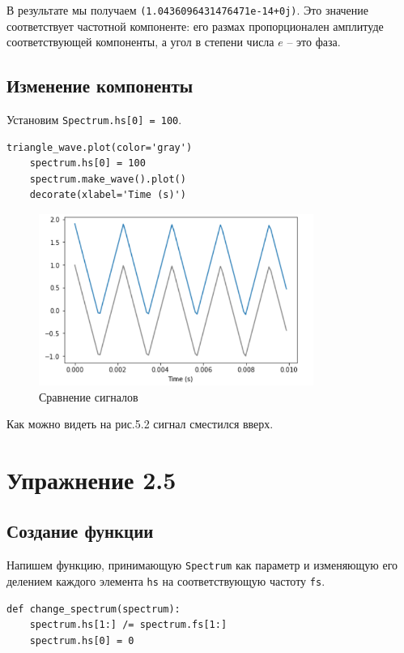 \documentclass[a4paper,12pt]{report}
\begin{document}
    В результате мы получаем \texttt{(1.0436096431476471e-14+0j)}. Это значение соответствует частотной компоненте: его размах пропорционален амплитуде соответствующей компоненты, а угол в степени числа $e$ – это фаза.

\section{Изменение компоненты}
    Установим \texttt{Spectrum.hs[0] = 100}.
\begin{lstlisting}[caption=Изменение компоненты]
    triangle_wave.plot(color='gray')
    spectrum.hs[0] = 100
    spectrum.make_wave().plot()
    decorate(xlabel='Time (s)')
\end{lstlisting}

\begin{figure}[H]
        \centering
        \includegraphics[width=0.8\textwidth]{fig5-2.PNG}
        \caption{Сравнение сигналов}
        \label{fig:fig5-2}
\end{figure}   

    Как можно видеть на рис.5.2 сигнал сместился вверх.

\chapter{Упражнение 2.5}
\section{Создание функции}
    Напишем функцию, принимающую  \texttt{Spectrum} как параметр и изменяющую его делением каждого элемента \texttt{hs} на соответствующую частоту \texttt{fs}.
\begin{lstlisting}[caption=Функция изменения спектра]
def change_spectrum(spectrum):
    spectrum.hs[1:] /= spectrum.fs[1:]
    spectrum.hs[0] = 0
\end{lstlisting} 
\end{document}
